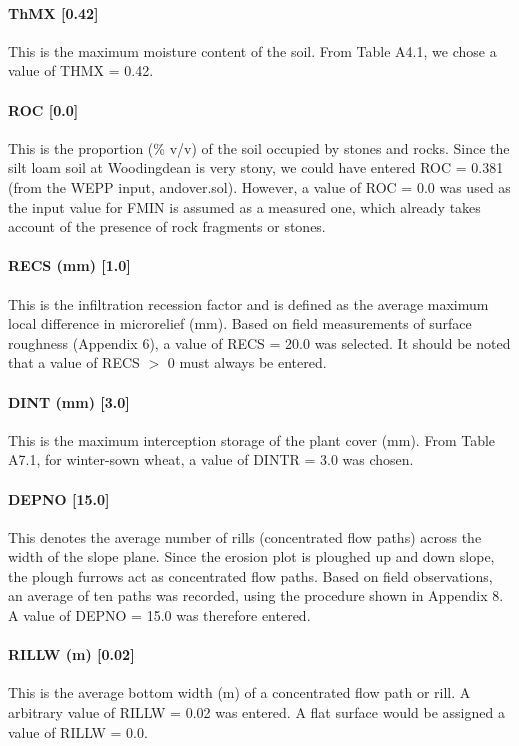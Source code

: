 \paragraph{ThMX [0.42]}
This is the maximum moisture content of the soil. From Table A4.1, we chose a value of THMX = 0.42.
 
\paragraph{ROC [0.0]}
This is the proportion (\% v/v) of the soil occupied by stones and rocks. Since the silt loam soil at Woodingdean is very stony, we could have entered ROC = 0.381 (from the WEPP input, andover.sol). However, a value of ROC = 0.0 was used as the input value for FMIN is assumed as a measured one, which already takes account of the presence of rock fragments or stones.
 
\paragraph{RECS (mm) [1.0]}
This is the infiltration recession factor and is defined as the average maximum local difference in microrelief (mm). Based on field measurements of surface roughness (Appendix 6), a value of RECS = 20.0 was selected.
It should be noted that a value of RECS $>$ 0 must always be entered.
 
\paragraph{DINT (mm) [3.0]}
This is the maximum interception storage of the plant cover (mm). From Table A7.1, for winter-sown wheat, a value of DINTR = 3.0 was chosen.
 
\paragraph{DEPNO [15.0]}
This denotes the average number of rills (concentrated flow paths) across the width of the slope plane. Since the erosion plot is ploughed up and down slope, the plough furrows act as concentrated flow paths. Based on field observations, an average of ten paths was recorded, using the procedure shown in Appendix 8. A value of DEPNO = 15.0 was therefore entered.
 
\paragraph{RILLW (m) [0.02]}
This is the average bottom width (m) of a concentrated flow path or rill. A arbitrary value of RILLW = 0.02 was entered.
A flat surface would be assigned a value of RILLW = 0.0.
 
